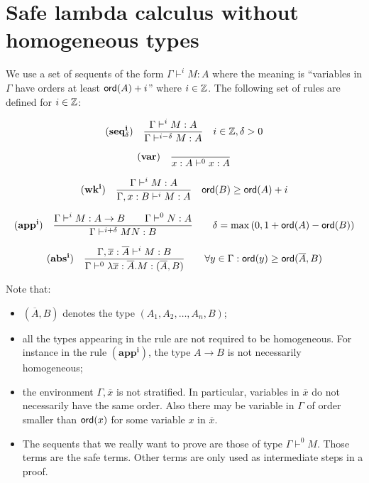 \section{Safe lambda calculus without homogeneous types}

We use a set of sequents of the form $\Gamma \vdash^{i} M : A$ where
the meaning is ``variables in $\Gamma$ have orders at least
${\sf ord}(A)+i$'' where $i \in \mathbb{Z}$. The following set of rules are
defined for $i \in \mathbb{Z}$:

$$ \mathbf{(seq^i_\delta)} \quad \frac{\displaystyle \Gamma \vdash^{i} M : A}{\Gamma \vdash^{i-\delta} M : A} \quad i \in \mathbb{Z}, \delta > 0  $$

$$ \mathbf{(var)} \quad  \frac{\displaystyle }{x : A\vdash^{0} x : A} $$

$$ \mathbf{(wk^i)} \quad  \frac{\displaystyle \Gamma \vdash^i M : A}{\Gamma , x : B \vdash^i M : A} \quad {\sf ord}(B) \geq {\sf ord}(A) + i $$

$$ \mathbf{(app^i)} \quad  \frac{\displaystyle \Gamma \vdash^i M : A\rightarrow B
                                        \qquad \Gamma \vdash^{0} N : A}{\Gamma  \vdash^{i+\delta} M N : B}
                                    \qquad
                                   \delta = \max\left(0, 1 + {\sf ord}(A) - {\sf ord}(B)\right)$$

$$ \mathbf{(abs^i)} \quad  \frac{\displaystyle \Gamma, \overline{x} : \overline{A} \vdash^{i} M : B}{\Gamma  \vdash^{0} \lambda \overline{x} : \overline{A} . M : (\overline{A},B)} \qquad
                                   \forall y \in \Gamma : {\sf ord}(y) \geq {\sf ord}(\overline{A},B)$$


Note that:
\begin{itemize}
\item $(\overline{A},B)$ denotes the type $(A_1,A_2, \ldots, A_n, B)$;
\item all the types appearing in the rule are not required to be homogeneous. For instance in the rule $\mathbf{(app^i)}$, the type $A \rightarrow B$ is not necessarily
homogeneous;
\item the environment $\Gamma, \overline{x}$ is not stratified. In particular, variables in $\overline{x}$ do not necessarily have the same order. Also
there may be variable in $\Gamma$ of order smaller than ${\sf ord}(x)$
for some variable $x$ in $\overline{x}$.
\item The sequents that we really want to prove are those of type $\Gamma \vdash^0 M$. Those terms are the safe terms.
Other terms are only used as intermediate steps in a proof.
\end{itemize}

